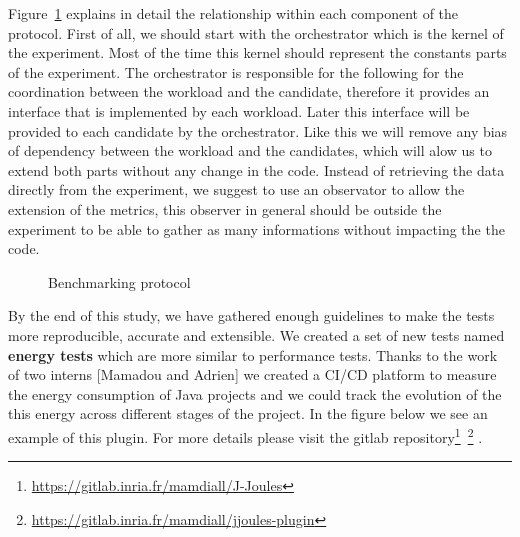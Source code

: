Figure~\ref{fig:benchmarkingprotocol} explains in detail the relationship within each component of the protocol.
First of all, we should start with the orchestrator which is the kernel of the experiment. Most of the time this kernel should represent the constants parts of the experiment.
The orchestrator is responsible for the following  for the coordination between the workload and the candidate, therefore it provides an interface that is implemented by each workload.
Later this interface will be provided to each candidate by the orchestrator. Like this we will remove any bias of dependency between the workload and the candidates, which will alow us to extend both parts without any change in the code.
Instead of retrieving the data directly from the experiment, we suggest to use an observator to allow the extension of the metrics, this observer in general should be outside the experiment to be able to gather as many informations without impacting the the code.
\begin{figure}[!htb]
    \caption{Benchmarking protocol}\label{fig:benchmarkingprotocol}
\end{figure}



By the end of this study, we have gathered enough guidelines to make the tests more reproducible, accurate and extensible.
We created a set of new tests named \textbf{energy tests} which are more similar to performance tests.
Thanks to the work of two interns [Mamadou and Adrien] we created a CI/CD platform to measure the energy consumption of Java projects and we could track the evolution of the this energy across different stages of the project.
In the figure below we see an example of this plugin.
For more details please visit the gitlab repository\footnote{\url{https://gitlab.inria.fr/mamdiall/J-Joules}}~\footnote{\url{https://gitlab.inria.fr/mamdiall/jjoules-plugin}} .

